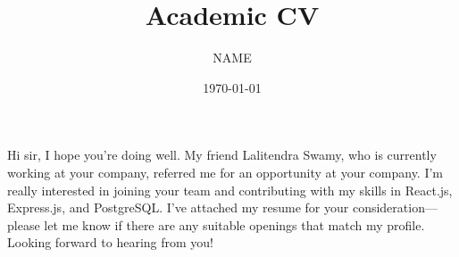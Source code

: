 \documentclass{article}
\title{Academic CV}
\author{{{NAME}}}
\date{\today}
\begin{document}
\maketitle

Hi sir, I hope you're doing well. My friend Lalitendra Swamy, who is currently working at your company, referred me for an opportunity at your company. I'm really interested in joining your team and contributing with my skills in React.js, Express.js, and PostgreSQL. I've attached my resume for your consideration—please let me know if there are any suitable openings that match my profile. Looking forward to hearing from you!
\end{document}
